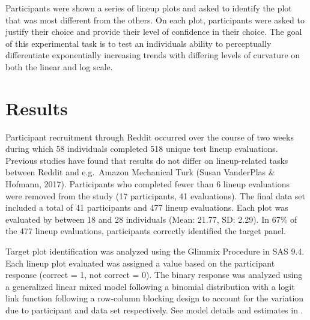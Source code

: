 \documentclass[print]{nuthesis}
\begin{document}
Participants were shown a series of lineup plots and asked to identify the plot that was most different from the others.
On each plot, participants were asked to justify their choice and provide their level of confidence in their choice.
The goal of this experimental task is to test an individuals ability to perceptually differentiate exponentially increasing trends with differing levels of curvature on both the linear and log scale.

\hypertarget{results}{%
\section{Results}\label{results}}

Participant recruitment through Reddit occurred over the course of two weeks during which 58 individuals completed 518 unique test lineup evaluations. Previous studies have found that results do not differ on lineup-related tasks between Reddit and e.g.~Amazon Mechanical Turk (Susan VanderPlas \& Hofmann, 2017).
Participants who completed fewer than 6 lineup evaluations were removed from the study (17 participants, 41 evaluations).
The final data set included a total of 41 participants and 477 lineup evaluations.
Each plot was evaluated by between 18 and 28 individuals (Mean: 21.77, SD: 2.29).
In 67\% of the 477 lineup evaluations, participants correctly identified the target panel.

Target plot identification was analyzed using the Glimmix Procedure in SAS 9.4.
Each lineup plot evaluated was assigned a value based on the participant response (correct = 1, not correct = 0).
The binary response was analyzed using a generalized linear mixed model following a binomial distribution with a logit link function following a row-column blocking design to account for the variation due to participant and data set respectively. See model details and estimates in .
\end{document}
